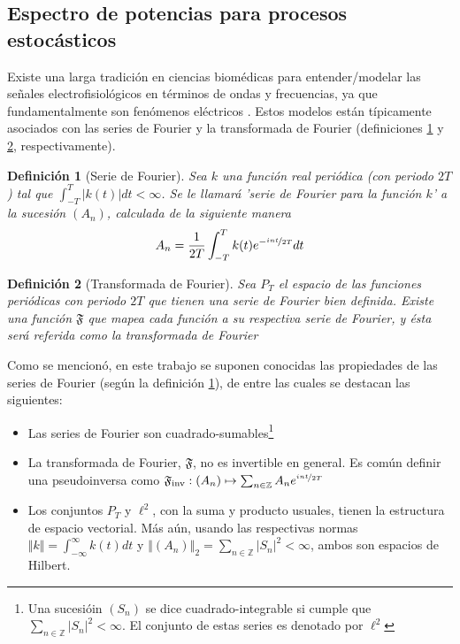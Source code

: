 \documentclass[12pt,a4paper]{mitthesis}
\newtheorem{defn}{Definici\'on}
\newcommand{\intR}{\int_{-\infty}^{\infty}}
\newcommand{\simint}[1]{\int_{- #1 }^{ #1 }}
\newcommand{\abso}[1]{\left| #1 \right|}
\begin{document}

\subsection{Espectro de potencias para procesos estoc\'asticos}

Existe una larga tradici\'on en ciencias biom\'edicas para entender/modelar las se\~nales
electrofisiol\'ogicos en t\'erminos de ondas y frecuencias, ya que fundamentalmente son fen\'omenos 
el\'ectricos \cite{Kaiser00}.  
Estos modelos est\'an t\'ipicamente asociados con las series de Fourier y la transformada de 
Fourier (definiciones \ref{FourierClasico} y \ref{trFourier}, respectivamente).

\begin{defn}[Serie de Fourier]
Sea $k$ una funci\'on real peri\'odica (con periodo $2T$) tal que 
$\simint{T} \abso{k(t)} dt < \infty$. 
Se le llamar\'a 'serie de Fourier para la funci\'on $k$' a la sucesi\'on $\left( A_n \right)$, 
calculada de la siguiente manera
\begin{equation*}
A_n = \frac{1}{2 T} \simint{T} k(t) e^{-\nicefrac{ i n t}{2T}} dt
\end{equation*}
\label{FourierClasico}
\end{defn}

\begin{defn}[Transformada de Fourier]
Sea $P_T$ el espacio de las funciones peri\'odicas con periodo $2T$ que tienen una serie de Fourier 
bien definida. Existe una funci\'on $\mathfrak{F}$ que mapea cada funci\'on a su respectiva serie 
de Fourier, y \'esta ser\'a referida como la transformada de Fourier
\label{trFourier}
\end{defn}

Como se mencion\'o, en este trabajo se suponen conocidas las propiedades de las series de Fourier 
(seg\'un la definici\'on \ref{FourierClasico}), de entre las cuales se destacan las siguientes:
\begin{itemize}
\item Las series de Fourier  son cuadrado-sumables\footnote{Una sucesi\'oin $\left( S_n \right)$ se 
dice cuadrado-integrable si cumple que $\sum_{n\in \mathbb{Z}} \abso{S_n}^{2} < \infty$. El 
conjunto de estas series es denotado por $\ell^{2}$}

\item La transformada de Fourier, $\mathfrak{F}$, no es invertible en general. Es com\'un definir
una pseudoinversa como 
$\mathfrak{F}_{\text{inv}} 
: \left( A_n \right) \mapsto \sum_{n \in \mathbb{Z}} A_n e^{\nicefrac{i n t}{2 T}} $

\item Los conjuntos $P_T$ y $\ell^{2}$, con la suma y producto usuales, tienen la estructura de 
espacio vectorial. M\'as a\'un, usando las respectivas normas $\Vert k \Vert = \intR k(t) dt$ y 
$\left\Vert \left( A_n \right) \right\Vert_2 = \sum_{n\in \mathbb{Z}} \abso{S_n}^{2} < \infty$,
ambos son espacios de Hilbert.
\end{itemize}
\end{document}
